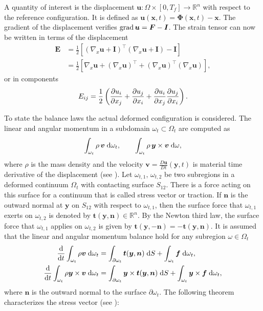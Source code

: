 A quantity of interest is the displacement $\bm{u}: \Omega \times [0, T_f] \rightarrow \mathbb{R}^n$ with respect to the reference configuration. It is defined as $\bm{u}(\bm{x}, t) = \bm{\Phi}(\bm{x}, t) - \bm{x}$. The gradient of the displacement verifies $\operatorname*{grad}\bm{u} = \bm{F} - \bm{I}$. The strain tensor can now be written in terms of the displacement
\begin{equation*}
\begin{aligned}
\bm{E} &= \frac{1}{2}\left[(\nabla_x \bm{u} + \bm{I})^\top (\nabla_x \bm{u} + \bm{I}) - \bm{I}\right] \\
&= \frac{1}{2}\left[\nabla_x \bm{u} + (\nabla_x \bm{u})^\top + (\nabla_x \bm{u})^\top (\nabla_x \bm{u})\right],
\end{aligned}
\end{equation*}
or in components \[
E_{ij} = \frac{1}{2} \left(\diffp{u_i}{x_j} + \diffp{u_j}{x_i} + \diffp{u_i}{x_j}\diffp{u_j}{x_i}\right).
\]

To state the balance laws the actual deformed configuration is considered. The linear and angular momentum in a subdomain $\omega_t \subset \Omega_t$ are computed as 
\[
\int_{\omega_t} \rho \, \bm{v} \d{\omega_t}, \qquad \int_{\omega_t} \rho \, \bm{y} \times \bm{v} \d{\omega},
\]
where $\rho$ is the mass density and the velocity $\bm{v} = \frac{D\bm{u}}{Dt}(\bm{y},t)$ is material time derivative of the displacement (see \cite[Chapter 1]{abeyaratne2012notes}).  Let $\omega_{t, 1},\, \omega_{t, 2}$ be two subregions in a deformed continuum $\Omega_t$ with contacting surface $S_{12}$. There is a force acting on this surface for a continuum that is called stress vector or traction. If $\bm{n}$ is the outward normal at $\bm{y}$ on $S_{12}$ with respect to $\omega_{t, 1}$, then the surface force that $\omega_{t, 1}$ exerts on $\omega_{t, 2}$ is denoted by $\bm{t}(\bm{y}, \bm{n}) \in \mathbb{R}^n$. By the Newton third law, the surface force that $\omega_{t, 1}$ applies on $\omega_{t, 2}$ is given by $\bm{t}(\bm{y}, -\bm{n}) = - \bm{t}(\bm{y}, \bm{n})$. It is assumed that the linear and angular momentum balance hold for any subregion $\omega \in \Omega_t$ 
\begin{align*}
	\diff{}{t} \int_{\omega_t} \rho \bm{v} \d{\omega_t} &= \int_{\partial \omega_t} \bm{t}(\bm{y}, \bm{n}) \d{S} + \int_{\omega_t} \bm{f} \d{\omega_t}, \\
	\diff{}{t} \int_{\omega_t} \rho\bm{y} \times \bm{v} \d{\omega_t} &= \int_{\partial \omega_t} \bm{y} \times \bm{t}(\bm{y}, \bm{n}) \d{S} + \int_{\omega_t} \bm{y} \times \bm{f} \d{\omega_t}, \\
\end{align*}
where $\bm{n}$ is the outward normal to the surface $\partial\omega_t$. The following theorem characterizes the stress vector (see \cite[Chapter 2]{ciarlet1988mathematical}):

